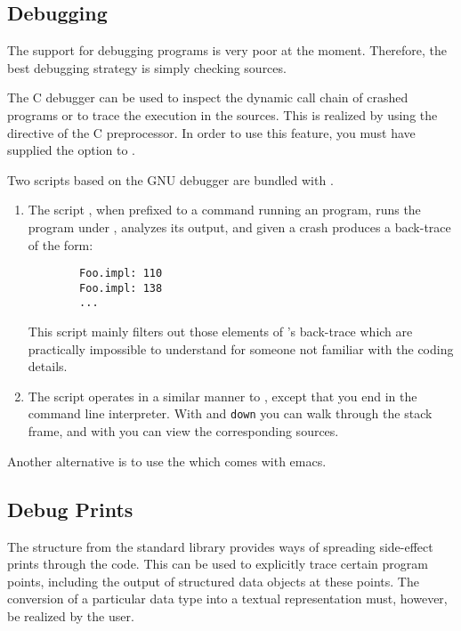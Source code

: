 \subsection{Debugging}
\label{sec:debug}
The support for debugging \opal{} programs is very poor at the moment.
Therefore, the best debugging strategy is simply checking \opal{}
sources.

The C debugger can be used to inspect the dynamic call chain of
crashed programs or to trace the execution in the \opal{} sources.
This is realized by using the  directive of the C
preprocessor. In order to use this feature, you must have supplied the
option  to .

Two scripts based on the GNU debugger  are bundled with .

\begin{enumerate}
\item The script , when prefixed to a command running an \opal{}
  program, runs the program under , analyzes its output, and 
  given a crash produces a back-trace of the form:
  \begin{verbatim}
        Foo.impl: 110
        Foo.impl: 138
        ...
  \end{verbatim}
  This script mainly filters out those elements of 's back-trace which
  are practically impossible to understand for someone not familiar with the
  coding details.
\item The script  operates in a similar manner to
  , except that you end in the  command line
  interpreter. With  and {\tt down} you can walk through the
  stack frame, and with  you can view the corresponding
  \opal{} sources.
\end{enumerate}

Another alternative is to use the  which comes with emacs.

\subsection{Debug Prints}

The structure  from the standard library provides ways of spreading
side-effect prints through the \opal{} code.  This can be used to explicitly
trace certain program points, including the output of structured data objects
at these points. The conversion of a particular data type into a textual
representation must, however, be realized by the user.

